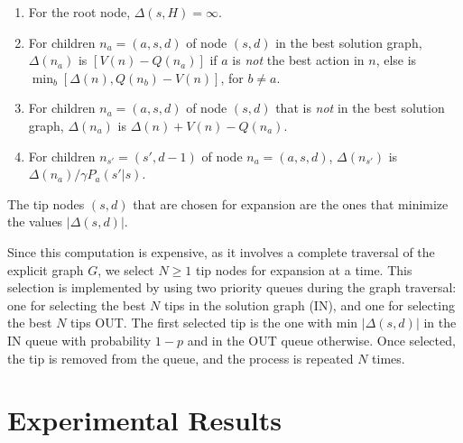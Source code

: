 \documentclass[letterpaper]{article}
\newcommand{\Omit}[1]{}
\begin{document}
\begin{enumerate}[1.]
\item For the root node,  $\Delta(s,H)=\infty$.
\item For children $n_a = (a,s,d)$ of node $(s,d)$ 
in the best solution graph, $\Delta(n_a)$ is $[V(n)-Q(n_a)]$
if $a$ is \emph{not} the best action in $n$, else is 
$\min_b[\Delta(n),Q(n_b)-V(n)]$, for $b \not= a$. 
\item For children $n_a = (a,s,d)$ of node $(s,d)$ 
that is \emph{not} in the best solution graph, $\Delta(n_a)$ is $\Delta(n) + V(n) - Q(n_a)$.
\item For children $n_{s'} = (s',d-1)$ of node $n_a = (a,s,d)$, $\Delta(n_{s'})$
is $\Delta(n_a)/\gamma P_a(s'|s)$.
\end{enumerate}



The tip nodes  $(s,d)$ that are  chosen for expansion 
are the ones that minimize  the values $|\Delta(s,d)|$.
\Omit{
if the choice is IN, they are selected among the tip nodes
in the best solution graph, if the choice is OUT, among those
not in the best solution graph.  }
Since this  computation is expensive, as  it involves a 
complete traversal of the explicit graph $G$,
we select  $N\geq 1$ tip nodes for expansion at a time. 
This selection  is implemented by using two priority queues during the graph traversal:
one for selecting the best $N$  tips in the solution graph (IN),  and one for selecting the best $N$ tips OUT. 
The first selected tip  is the one with  min $|\Delta(s,d)|$ in the IN queue with  probability $1-p$ and in the OUT queue otherwise.
Once selected, the tip is removed from the queue, and the process is repeated $N$ times.%

\section{Experimental Results}
\end{document}
